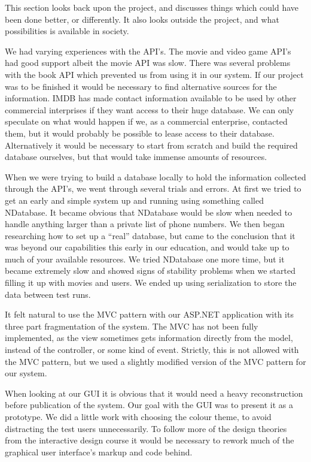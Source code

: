 This section looks back upon the project, and discusses things which could have been done better, or differently. It also looks outside the project, and what possibilities is available in society.

We had varying experiences with the API’s. The movie and video game API's had good support albeit the movie API was slow. There was several problems with the book API which prevented us from using it in our system. If our project was to be finished it would be necessary to find alternative sources for the information. IMDB has made contact information available to be used by other commercial interprises if they want access to their huge database. We can only speculate on what would happen if we, as a commercial enterprise, contacted them, but it would probably be possible to lease access to their database. Alternatively it would be necessary to start from scratch and build the required database ourselves, but that would take immense amounts of resources.

When we were trying to build a database locally to hold the information collected through the API’s, we went through several trials and errors. At first we tried to get an early and simple system up and running using something called NDatabase. It became obvious that NDatabase would be slow when needed to handle anything larger than a private list of phone numbers. We then began researching how to set up a “real” database, but came to the conclusion that it was beyond our capabilities this early in our education, and would take up to much of your available resources. We tried NDatabase one more time, but it became extremely slow and showed signs of stability problems when we started filling it up with movies and users. We ended up using serialization to store the data between test runs.

It felt natural to use the MVC pattern with our ASP.NET application with its three part fragmentation of the system. The MVC has not been fully implemented, as the view sometimes gets information directly from the model, instead of the controller, or some kind of event. Strictly, this is not allowed with the MVC pattern, but we used a slightly modified version of the MVC pattern for our system.     

When looking at our GUI it is obvious that it would need a heavy reconstruction before publication of the system. Our goal with the GUI was to present it as a prototype. We did a little work with choosing the colour theme, to avoid distracting the test users unnecessarily. To follow more of the design theories from the interactive design course it would be necessary to rework much of the graphical user interface's markup and code behind.

